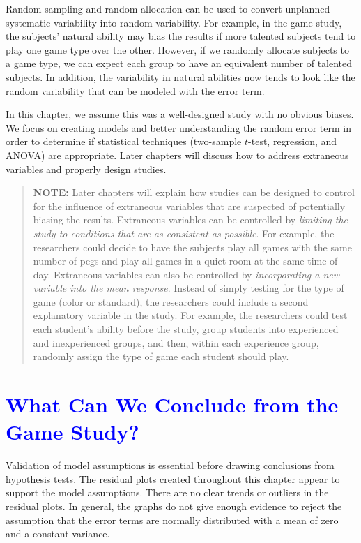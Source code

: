 \documentclass[
]{report}
\begin{document}
Random sampling and random allocation can be used to convert unplanned systematic variability into random variability. For example, in the game study, the subjects' natural ability may bias the results if more talented subjects tend to play one game type over the other. However, if we randomly allocate subjects to a game type, we can expect each group to have an equivalent number of talented subjects. In addition, the variability in natural abilities now tends to look like the random variability that can be modeled with the error term.

In this chapter, we assume this was a well-designed study with no obvious biases. We focus on creating models and better understanding the random error term in order to determine if statistical techniques (two-sample \(\scriptstyle t\)-test, regression, and ANOVA) are appropriate. Later chapters will discuss how to address extraneous variables and properly design studies.

\begin{quote}
\textbf{NOTE:}
Later chapters will explain how studies can be designed to control for the influence of extraneous variables that are suspected of potentially biasing the results. Extraneous variables can be controlled by \emph{limiting the study to conditions that are as consistent as possible}. For example, the researchers could decide to have the subjects play all games with the same number of pegs and play all games in a quiet room at the same time of day. Extraneous variables can also be controlled by \emph{incorporating a new variable into the mean response}. Instead of simply testing for the type of game (color or standard), the researchers could include a second explanatory variable in the study. For example, the researchers could test each student's ability before the study, group students into experienced and inexperienced groups, and then, within each experience group, randomly assign the type of game each student should play.
\end{quote}

\hypertarget{section-20}{%
\section{\texorpdfstring{\textcolor{blue}{ What Can We Conclude from the Game Study?}}{}}\label{section-20}}

Validation of model assumptions is essential before drawing conclusions from hypothesis tests. The residual plots created throughout this chapter appear to support the model assumptions. There are no clear trends or outliers in the residual plots. In general, the graphs do not give enough evidence to reject the assumption that the error terms are normally distributed with a mean of zero and a constant variance.
\end{document}
